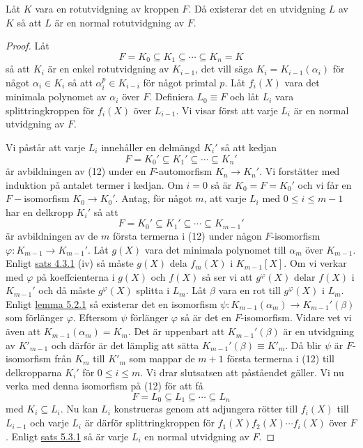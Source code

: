 \documentclass{article}
\theoremstyle{definition}
\begin{document}
\hypertarget{lemma10.0.2}{}
\begin{mylemma}{}{}
  Låt $K$ vara en rotutvidgning av kroppen $F$. Då existerar det en utvidgning $L$ av $K$ så att $L$ är en normal rotutvidgning av $F$.
\end{mylemma}

\begin{proof}
  Låt
  \begin{equation}
    F = K_0 \subseteq K_1 \subseteq \cdots \subseteq K_n = K
  \end{equation}
  så att $K_i$ är en enkel rotutvidgning av $K_{i-1}$, det vill säga $K_i = K_{i-1}(\alpha_i)$ för något $\alpha_i \in K_i$ 
  så att  $\alpha_i^p \in K_{i-i}$ för något primtal $p$. Låt $f_i(X)$ vara det minimala polynomet av $\alpha_i$ över $F$. 
  Definiera $L_0 \equiv F$ och låt $L_i$ vara splittringkroppen för $f_i(X)$ över $L_{i-1}$. 
  Vi visar först att varje $L_i$ är en normal utvidgning av $F$.
  
  Vi påstår att varje $L_i$ innehåller en delmängd $K_i'$ så att kedjan
  \[F = K_0' \subseteq K_1' \subseteq \cdots \subseteq K_n'\]
  är avbildningen av (12) under en $F$-automorfism $K_n \rightarrow K_n'$. Vi forstätter med induktion på antalet termer i 
  kedjan. Om $i = 0$ så är $K_0 = F = K_0'$ och vi får en $F-$isomorfism $K_0 \rightarrow K_0'$.
  Antag, för något $m$, att varje $L_i$ med $0 \leq i \leq m -1$ har en delkropp $K_i'$ så att 
  \[F = K_0' \subseteq K_1' \subseteq \cdots \subseteq K_{m-1}'\]
  är avbildningen av de $m$ första termerna i (12) under någon $F$-isomorfism $\varphi: K_{m-1} \rightarrow K_{m-1}'$.
  Låt $g(X)$ vara det minimala polynomet till $\alpha_m$ över $K_{m-1}$. Enligt \hyperlink{minpol}{sats 4.3.1} (iv) så måste $g(X)$ dela 
  $f_m(X)$ i $K_{m-1}[X]$. Om vi verkar med $\varphi$ på koeffcienterna i $g(X)$ och $f(X)$ så ser vi att $g^\varphi(X)$ delar $f(X)$ i $K_{m-1}'$ och 
  då måste $g^\varphi(X)$ splitta i $L_{m}$. Låt $\beta$ vara en rot till $g^\varphi(X)$ i $L_m$. 
  Enligt \hyperlink{6.0.2}{lemma 5.2.1} så existerar det en isomorfism $\psi: K_{m-1}(\alpha_m) \rightarrow K_{m-1}'(\beta)$ som 
  förlänger $\varphi$. Eftersom $\psi$ förlänger $\varphi$ så är det en $F$-isomorfism. Vidare vet vi även att $K_{m-1}(\alpha_m) = K_m$. 
  Det är uppenbart att $K_{m-1}'(\beta)$ är en utvidgning av $K'_{m-1}$ och därför är det lämplig att sätta $K_{m-1}'(\beta) \equiv K'_{m}$. 
  Då blir $\psi$ är $F$-isomorfism från $K_{m}$ till $K'_{m}$ som mappar de $m+1$ första termerna i (12) till delkropparna $K_i'$ för $0 \leq i \leq m$. 
  Vi drar slutsatsen att påståendet gäller. Vi nu verka med denna isomorfism på (12) för att få 
  \[F = L_0 \subseteq L_1 \subseteq \cdots \subseteq L_n\]
  med $K_i \subseteq L_i$. Nu kan $L_i$ konstrueras genom att adjungera rötter till $f_i(X)$ till $L_{i-1}$
  och varje $L_i$ är därför splittringkroppen för $f_1(X)f_2(X)\cdots  f_i(X)$ över $F$. Enligt \hyperlink{sats6.3.1}{sats 5.3.1}
  så är varje $L_i$ en normal utvidgning av $F$.


\end{proof}
\end{document}

